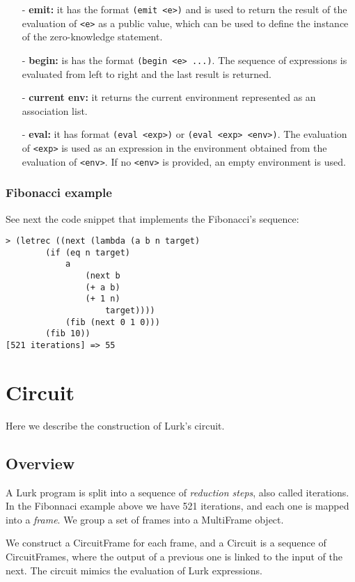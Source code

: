 \documentclass[10pt, english]{article}
\begin{document}
\begin{itemize}
  \item[-] \textbf{emit:} it has the format \verb|(emit <e>)| and is used to return the result of the evaluation of \verb|<e>| as a public value, which can be used to define the instance of the zero-knowledge statement.
  \item[-] \textbf{begin:} is has the format \verb|(begin <e> ...)|. The sequence of expressions is evaluated from left to right and the last result is returned.
  \item[-] \textbf{current env:} it returns the current environment represented as an association list.
  \item[-] \textbf{eval:} it has format \verb|(eval <exp>)| or \verb|(eval <exp> <env>)|. The evaluation of \verb|<exp>| is used as an expression in the environment obtained from the evaluation of \verb|<env>|. If no \verb|<env>| is provided, an empty environment is used.
\end{itemize}

\subsubsection{Fibonacci example}

See next the code snippet that implements the Fibonacci's sequence:

\begin{verbatim}
> (letrec ((next (lambda (a b n target)
        (if (eq n target)
            a
                (next b
                (+ a b)
                (+ 1 n)
                    target))))
            (fib (next 0 1 0)))
        (fib 10))
[521 iterations] => 55
\end{verbatim}

\section{Circuit}

Here we describe the construction of Lurk's circuit.

\subsection{Overview}

A Lurk program is split into a sequence of \textit{reduction steps}, also called iterations. In the Fibonnaci example above we have 521 iterations, and each one is mapped into a \textit{frame}. We group a set of frames into a MultiFrame object.

We construct a CircuitFrame for each frame, and a Circuit is a sequence of CircuitFrames, where the output of a previous one is linked to the input of the next. The circuit mimics the evaluation of Lurk expressions.
\end{document}
